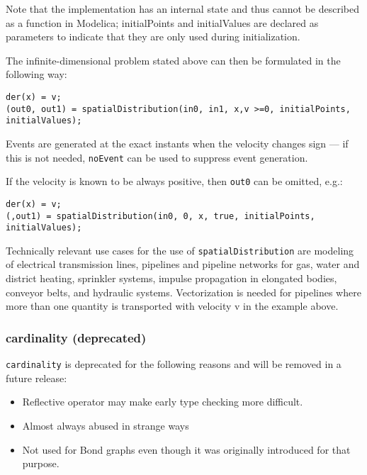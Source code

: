 \begin{nonnormative}
Note that the implementation has an internal state and thus
cannot be described as a function in Modelica; initialPoints and
initialValues are declared as parameters to indicate that they are only
used during initialization.

The infinite-dimensional problem stated above can then be formulated in the following way:
\begin{lstlisting}[language=modelica]
der(x) = v;
(out0, out1) = spatialDistribution(in0, in1, x,v >=0, initialPoints, initialValues);
\end{lstlisting}

Events are generated at the exact instants when the velocity
changes sign --- if this is not needed, \lstinline!noEvent! can be used to
suppress event generation.

If the velocity is known to be always positive, then \lstinline!out0! can be omitted, e.g.:
\begin{lstlisting}[language=modelica]
der(x) = v;
(,out1) = spatialDistribution(in0, 0, x, true, initialPoints, initialValues);
\end{lstlisting}
Technically relevant use cases for the use of
\lstinline!spatialDistribution! are modeling of electrical
transmission lines, pipelines and pipeline networks for gas, water and
district heating, sprinkler systems, impulse propagation in elongated
bodies, conveyor belts, and hydraulic systems. Vectorization is needed
for pipelines where more than one quantity is transported with velocity
v in the example above.
\end{nonnormative}

\subsubsection{cardinality (deprecated)}\label{cardinality-deprecated}

\begin{nonnormative}
\lstinline!cardinality! is deprecated for the following reasons and will be removed in a future release:
\begin{itemize}
\item
  Reflective operator may make early type checking more difficult.
\item
  Almost always abused in strange ways
\item
  Not used for Bond graphs even though it was originally introduced for that purpose.
\end{itemize}
\end{nonnormative}

